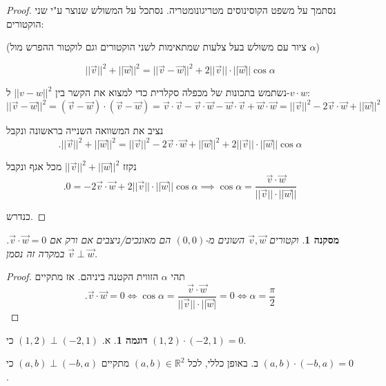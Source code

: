 \documentclass[12pt]{book}
\theoremstyle{plain}
\newtheorem{corollary}[theorem]{מסקנה}
\theoremstyle{definition}
\newtheorem{example}[theorem]{דוגמה}
\newcommand{\R}{\mathbb{R}}
\begin{document}
\begin{proof}
נסתמך על משפט הקוסינוסים מטריגונומטריה. נסתכל על המשולש שנוצר
ע"י שני הוקטורים:
\begin{center}
	(ציור עם משולש בעל צלעות שמתאימות לשני הוקטורים וגם לוקטור ההפרש מול
	\(\alpha\))
\end{center}

\begin{equation*}
||\vec{v}||^{2}+||\vec{w}||^{2}=||\vec{v}-\vec{w}||^{2}+2||\vec{v}||\cdot||\vec{w}||\cos\alpha
\end{equation*}

נשתמש בתכונות של מכפלה סקלרית כדי למצוא את הקשר בין \(||v-w||^{2}\)
ל-\(v\cdot w\):
\begin{equation*}
	||\vec{v}-\vec{w}||^{2}=(\vec{v}-\vec{w})\cdot(\vec{v}-\vec{w})=\vec{v}\cdot\vec{v}-\vec{v}\cdot\vec{w}-\vec{w}\cdot\vec{v}+\vec{w}\cdot\vec{w}=||\vec{v}||^{2}-2\vec{v}\cdot\vec{w}+||\vec{w}||^{2}
\end{equation*}

נציב את המשוואה השנייה בראשונה ונקבל
\begin{equation*}
.||\vec{v}||^{2}+||\vec{w}||^{2}=||\vec{v}||^{2}-2\vec{v}\cdot\vec{w}+||\vec{w}||^{2}+2||\vec{v}||\cdot||\vec{w}||\cos\alpha
\end{equation*}

נקזז \(||\vec{v}||^{2}+||\vec{w}||^{2}\) מכל אגף ונקבל
\begin{equation*}
.0=-2\vec{v}\cdot\vec{w}+2||\vec{v}||\cdot||\vec{w}||\cos\alpha\implies\cos\alpha=\frac{\vec{v}\cdot\vec{w}}{||\vec{v}||\cdot||\vec{w}||}
\end{equation*}

כנדרש.
\end{proof}

\begin{corollary}
	וקטורים \(\vec{v},\vec{w}\) השונים מ-\((0,0)\) הם מאונכים/ניצבים
	אם ורק אם \(\vec{v}\cdot\vec{w}=0\). במקרה זה נסמן \(\vec{v}\perp\vec{w}\).
\end{corollary}

\begin{proof}
תהי \(\alpha\) הזווית הקטנה ביניהם. אז מתקיים
\begin{equation*}
	.\vec{v}\cdot\vec{w}=0\iff\cos\alpha=\frac{\vec{v}\cdot\vec{w}}{||\vec{v}||\cdot||\vec{w}|}=0\iff\alpha=\frac{\pi}{2}
\end{equation*}
\end{proof}

\begin{example}
א. 
\((1,2)\perp(-2,1)\) כי \((1,2)\cdot(-2,1)=0\).

ב.
באופן כללי, לכל \((a,b)\in\R^{2}\) מתקיים \((a,b)\perp(-b,a)\)
כי \((a,b)\cdot(-b,a)=0\).
\end{example}
\end{document}
